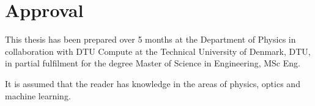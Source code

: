 \section*{Approval}
This thesis has been prepared over 5 months at 
the Department of Physics in collaboration with
DTU Compute at the Technical University of Denmark, DTU, in partial fulfilment for the degree Master of Science in Engineering, MSc Eng. 

It is assumed that the reader has knowledge in the areas of physics, optics and machine learning.

\vfill

\begin{center}
\namesigdate{\thesisauthor~-~\studentnumber}
\end{center}

\vfill

